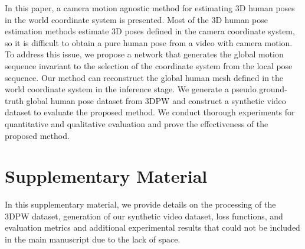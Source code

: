 \documentclass[10pt,twocolumn,letterpaper]{article}
\begin{document}
In this paper, a camera motion agnostic method for estimating 3D human poses in the world coordinate system is presented. Most of the 3D human pose estimation methods estimate 3D poses defined in the camera coordinate system, so it is difficult to obtain a pure human pose from a video with camera motion. To address this issue, we propose a network that generates the global motion sequence invariant to the selection of the coordinate system from the local pose sequence. Our method can reconstruct the global human mesh defined in the world coordinate system in the inference stage. We generate a pseudo ground-truth global human pose dataset from 3DPW and construct a synthetic video dataset to evaluate the proposed method. We conduct thorough experiments for quantitative and qualitative evaluation and prove the effectiveness of the proposed method.









\section*{Supplementary Material}

In this supplementary material, we provide details on the processing of the 3DPW dataset, generation of our synthetic video dataset, loss functions, and evaluation metrics and additional experimental results that could not be included in the main manuscript due to the lack of space.


\renewcommand{\thesection}{S\arabic{section}}
\setcounter{section}{0}
\end{document}
